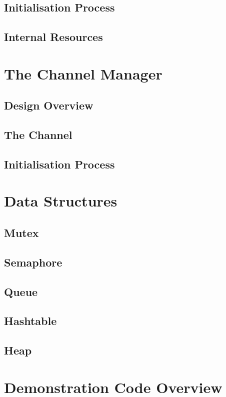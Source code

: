 \documentclass[12pt,a4paper]{article}
\begin{document}
\subsection{Initialisation Process}
\subsection{Internal Resources}

\section{The Channel Manager}
\subsection{Design Overview}
\subsection{The Channel}
\subsection{Initialisation Process}

\section{Data Structures}
\subsection{Mutex}
\subsection{Semaphore}
\subsection{Queue}
\subsection{Hashtable}
\subsection{Heap}

\section{Demonstration Code Overview}


\end{document}
